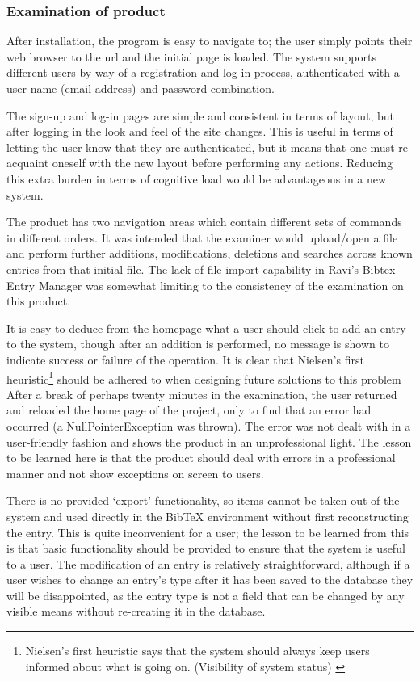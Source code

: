 \documentclass{l4proj}
\newcommand{\BibTeX}{B{\sc ib}\TeX}
\newcommand{\bibtex}{\BibTeX}
\begin{document}
\subsubsection{Examination of product}
After installation, the program is easy to navigate to; the user simply points their web browser to the \gls{url} and the initial page is loaded. The system supports different users by way of a registration and log-in process, authenticated with a user name (email address) and password combination.

The sign-up and log-in pages are simple and consistent in terms of layout, but after logging in the look and feel of the site changes.  This is useful in terms of letting the user know that they are authenticated, but it means that one must re-acquaint oneself with the new layout before performing any actions.  Reducing this extra burden in terms of cognitive load would be advantageous in a new system.

The product has two navigation areas which contain different sets of commands in different orders. 
It was intended that the examiner would upload/open a file and perform further additions, modifications, deletions and searches across known entries from that initial file.  The lack of file import capability in Ravi's Bibtex Entry Manager was somewhat limiting to the consistency of the examination on this product. 

It is easy to deduce from the homepage what a user should click to add an entry to the system, though after an addition is performed, no message is shown to indicate success or failure of the operation.  It is clear that Nielsen's first heuristic\footnote{\label{nielsenH1} Nielsen's first heuristic says that the system should always keep users informed about what is going on. (Visibility of system status) \cite{NielsenHeuristics}} should be adhered to when designing future solutions to this problem 
After a break of perhaps twenty minutes in the examination, the user returned and reloaded the home page of the project, only to find that an error had occurred (a NullPointerException was thrown).  The error was not dealt with in a user-friendly fashion and shows the product in an unprofessional light.  The lesson to be learned here is that the product should deal with errors in a professional manner and not show exceptions on screen to users.

There is no provided `export' functionality, so items cannot be taken out of the system and used directly in the \bibtex{} environment without first reconstructing the entry.  This is quite inconvenient for a user; the lesson to be learned from this is that basic functionality should be provided to ensure that the system is useful to a user.
The modification of an entry is relatively straightforward, although if a user wishes to change an entry's type after it has been saved to the database they will be disappointed, as the entry type is not a field that can be changed by any visible means without re-creating it in the database.
\end{document}
